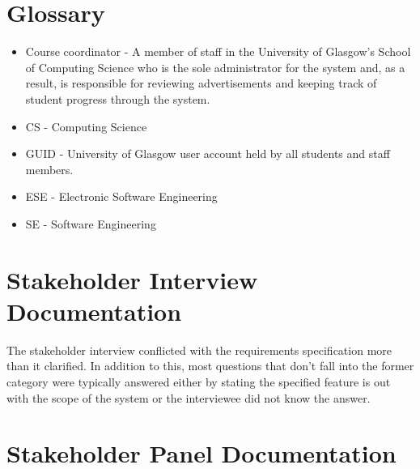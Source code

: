 \documentclass{l3deliverable}
\begin{document}

\appendix

\section{Glossary}

\begin{itemize}

\item Course coordinator - A member of staff in the University of Glasgow's
School of Computing Science who is the sole administrator for the system and, as
a result, is responsible for reviewing advertisements and keeping track of 
student progress through the system.

\item CS - Computing Science

\item GUID - University of Glasgow user account held by all students and staff
members.

\item ESE - Electronic Software Engineering

\item SE - Software Engineering

\end{itemize}



\section{Stakeholder Interview Documentation}

The stakeholder interview conflicted with the requirements specification more
than it clarified. In addition to this, most questions that don't fall into the
former category were typically answered either by stating the specified
feature is out with the scope of the system or the interviewee did not
know the answer.

\section{Stakeholder Panel Documentation}
\end{document}
